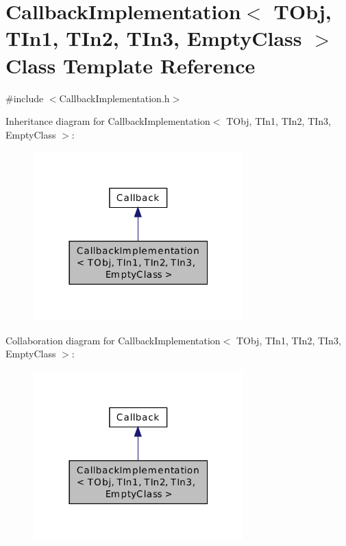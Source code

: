 \hypertarget{class_callback_implementation_3_01_t_obj_00_01_t_in1_00_01_t_in2_00_01_t_in3_00_01_empty_class_01_4}{\section{Callback\-Implementation$<$ T\-Obj, T\-In1, T\-In2, T\-In3, Empty\-Class $>$ Class Template Reference}
\label{class_callback_implementation_3_01_t_obj_00_01_t_in1_00_01_t_in2_00_01_t_in3_00_01_empty_class_01_4}
}


{\ttfamily \#include $<$Callback\-Implementation.\-h$>$}



Inheritance diagram for Callback\-Implementation$<$ T\-Obj, T\-In1, T\-In2, T\-In3, Empty\-Class $>$\-:\nopagebreak
\begin{figure}[H]
\begin{center}
\leavevmode
\includegraphics[width=230pt]{class_callback_implementation_3_01_t_obj_00_01_t_in1_00_01_t_in2_00_01_t_in3_00_01_empty_class_01_4__inherit__graph}
\end{center}
\end{figure}


Collaboration diagram for Callback\-Implementation$<$ T\-Obj, T\-In1, T\-In2, T\-In3, Empty\-Class $>$\-:\nopagebreak
\begin{figure}[H]
\begin{center}
\leavevmode
\includegraphics[width=230pt]{class_callback_implementation_3_01_t_obj_00_01_t_in1_00_01_t_in2_00_01_t_in3_00_01_empty_class_01_4__coll__graph}
\end{center}
\end{figure}
